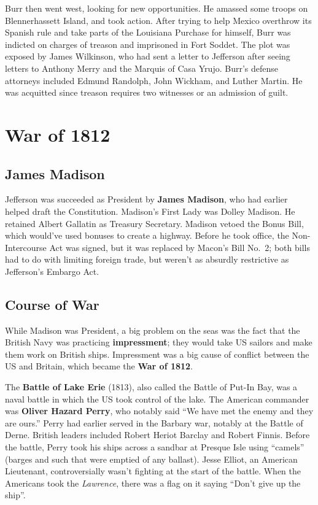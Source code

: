 Burr then went west, looking for new opportunities.
He amassed some troops on Blennerhassett Island, and took action.
After trying to help Mexico overthrow its Spanish rule and take parts of the Louisiana Purchase for himself,
Burr was indicted on charges of treason and imprisoned in Fort Soddet.
The plot was exposed by James Wilkinson,
who had sent a letter to Jefferson after seeing letters to Anthony Merry and the Marquis of Casa Yrujo.
Burr's defense attorneys included Edmund Randolph, John Wickham, and Luther Martin.
He was acquitted since treason requires two witnesses or an admission of guilt.

\section{War of 1812}

\subsection*{James Madison}

Jefferson was succeeded as President by \textbf{James Madison}, who had earlier helped draft the Constitution.
Madison's First Lady was Dolley Madison.
He retained Albert Gallatin as Treasury Secretary.
Madison vetoed the Bonus Bill, which would've used bonuses to create a highway.
Before he took office, the Non-Intercourse Act was signed, but it was replaced by Macon's Bill No.\ 2;
both bills had to do with limiting foreign trade,
but weren't as absurdly restrictive as Jefferson's Embargo Act.

\subsection*{Course of War}

While Madison was President,
a big problem on the seas was the fact that the British Navy was practicing \textbf{impressment};
they would take US sailors and make them work on British ships.
Impressment was a big cause of conflict between the US and Britain, which became the \textbf{War of 1812}.

The \textbf{Battle of Lake Erie} (1813), also called the Battle of Put-In Bay,
was a naval battle in which the US took control of the lake.
The American commander was \textbf{Oliver Hazard Perry}, who notably said
``We have met the enemy and they are ours.''
Perry had earlier served in the Barbary war, notably at the Battle of Derne.
British leaders included Robert Heriot Barclay and Robert Finnis.
Before the battle, Perry took his ships across a sandbar at Presque Isle using ``camels''
(barges and such that were emptied of any ballast).
Jesse Elliot, an American Lieutenant, controversially wasn't fighting at the start of the battle.
When the Americans took the \textit{Lawrence}, there was a flag on it saying ``Don't give up the ship''.

